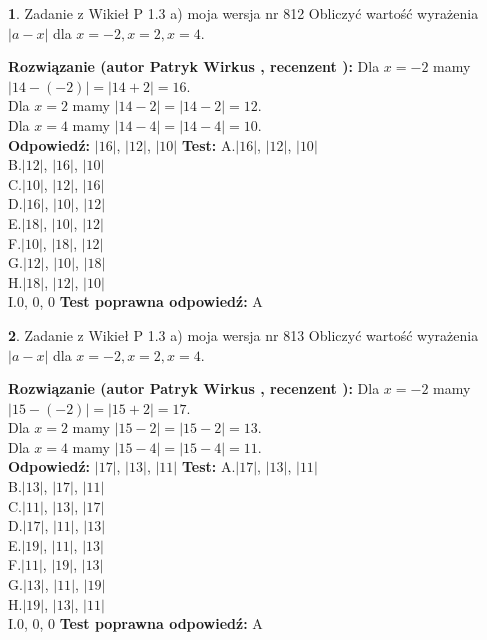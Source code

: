 \documentclass[12pt, a4paper]{article}
\theoremstyle{definition} %
\newtheorem{zad}{}
\newcommand{\zadStart}[1]{\begin{zad}#1\newline}
\newcommand{\zadStop}{\end{zad}}
\newcommand{\rozwStart}[2]{\noindent \textbf{Rozwiązanie (autor #1 , recenzent #2): }\newline}
\newcommand{\rozwStop}{\newline}
\newcommand{\odpStart}{\noindent \textbf{Odpowiedź:}\newline}
\newcommand{\odpStop}{\newline}
\newcommand{\testStart}{\noindent \textbf{Test:}\newline}
\newcommand{\testStop}{\newline}
\newcommand{\kluczStart}{\noindent \textbf{Test poprawna odpowiedź:}\newline}
\newcommand{\kluczStop}{\newline}
\begin{document}
\zadStart{Zadanie z Wikieł P 1.3 a) moja wersja nr 812}
Obliczyć wartość wyrażenia $|a - x|$ dla $x=-2,x=2,x=4$.
\zadStop
\rozwStart{Patryk Wirkus}{}
Dla $x = -2$ mamy $|14 - (-2)| = |14 + 2| = 16$.\\
Dla $x = 2$ mamy $|14 - 2| = |14 - 2| = 12$.\\
Dla $x = 4$ mamy $|14 - 4| = |14 - 4| = 10$.\\
\rozwStop
\odpStart
$|16|$, $|12|$, $|10|$
\odpStop
\testStart
A.$|16|$, $|12|$, $|10|$\\
B.$|12|$, $|16|$, $|10|$\\
C.$|10|$, $|12|$, $|16|$\\
D.$|16|$, $|10|$, $|12|$\\
E.$|18|$, $|10|$, $|12|$\\
F.$|10|$, $|18|$, $|12|$\\
G.$|12|$, $|10|$, $|18|$\\
H.$|18|$, $|12|$, $|10|$\\
I.$0$, $0$, $0$
\testStop
\kluczStart
A
\kluczStop



\zadStart{Zadanie z Wikieł P 1.3 a) moja wersja nr 813}
Obliczyć wartość wyrażenia $|a - x|$ dla $x=-2,x=2,x=4$.
\zadStop
\rozwStart{Patryk Wirkus}{}
Dla $x = -2$ mamy $|15 - (-2)| = |15 + 2| = 17$.\\
Dla $x = 2$ mamy $|15 - 2| = |15 - 2| = 13$.\\
Dla $x = 4$ mamy $|15 - 4| = |15 - 4| = 11$.\\
\rozwStop
\odpStart
$|17|$, $|13|$, $|11|$
\odpStop
\testStart
A.$|17|$, $|13|$, $|11|$\\
B.$|13|$, $|17|$, $|11|$\\
C.$|11|$, $|13|$, $|17|$\\
D.$|17|$, $|11|$, $|13|$\\
E.$|19|$, $|11|$, $|13|$\\
F.$|11|$, $|19|$, $|13|$\\
G.$|13|$, $|11|$, $|19|$\\
H.$|19|$, $|13|$, $|11|$\\
I.$0$, $0$, $0$
\testStop
\kluczStart
A
\kluczStop
\end{document}
